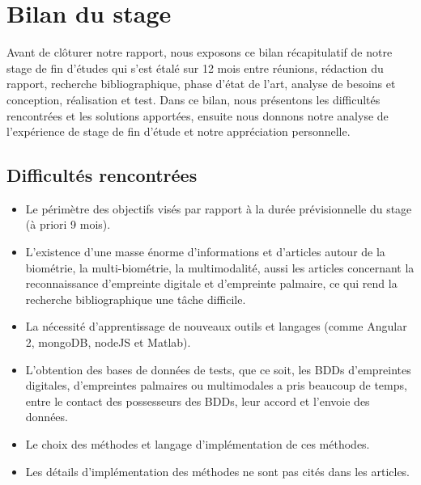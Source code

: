 
\chapter*{Bilan du stage}
Avant de clôturer notre rapport, nous exposons ce bilan récapitulatif de notre stage de fin d'études qui s'est étalé sur 12 mois entre réunions, rédaction du rapport, recherche bibliographique, phase d'état de l'art, analyse de besoins et conception, réalisation et test. Dans ce bilan, nous présentons les difficultés rencontrées et les solutions apportées, ensuite nous donnons notre analyse de l'expérience de stage de fin d'étude et notre appréciation personnelle.
\section*{Difficultés rencontrées}
\begin{itemize}
	\item Le périmètre des objectifs visés par rapport à la durée prévisionnelle du stage (à priori 9 mois).
	\item L'existence d'une masse énorme d'informations et d'articles autour de la biométrie, la multi-biométrie, la multimodalité, aussi les articles concernant la reconnaissance d'empreinte digitale et d'empreinte palmaire, ce qui rend la recherche bibliographique une tâche difficile.
	\item La nécessité d'apprentissage de nouveaux outils et langages (comme Angular 2, mongoDB, nodeJS et Matlab).
	\item L'obtention des bases de données de tests, que ce soit, les BDDs d'empreintes digitales, d'empreintes palmaires ou multimodales a pris beaucoup de temps, entre le contact des possesseurs des BDDs, leur accord et l'envoie des données.
	\item Le choix des méthodes et langage d'implémentation de ces méthodes. 
	\item Les détails d'implémentation des méthodes ne sont pas cités dans les articles.


	
\end{itemize}
